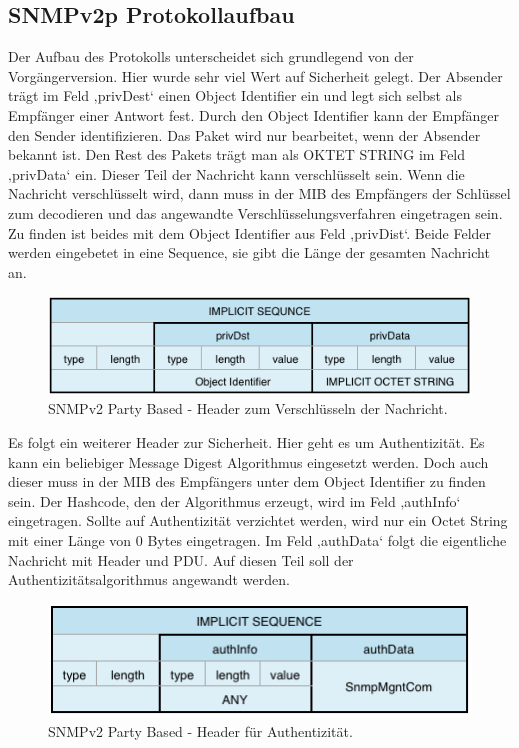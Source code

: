 \documentclass[11pt,a4paper]{article}
\begin{document}
\subsection{SNMPv2p Protokollaufbau}
Der Aufbau des Protokolls unterscheidet sich grundlegend von der Vorgängerversion. Hier wurde sehr viel Wert auf Sicherheit gelegt. Der Absender trägt im Feld ‚privDest‘ einen Object Identifier ein und legt sich selbst als Empfänger einer Antwort fest. Durch den Object Identifier kann der Empfänger den Sender identifizieren. Das Paket wird nur bearbeitet, wenn der Absender bekannt ist. Den Rest des Pakets trägt man als OKTET STRING im Feld ‚privData‘ ein. Dieser Teil der Nachricht kann verschlüsselt sein. Wenn die Nachricht verschlüsselt wird, dann muss in der MIB des Empfängers der Schlüssel zum decodieren und das angewandte Verschlüsselungsverfahren eingetragen sein. Zu finden ist beides mit dem Object Identifier aus Feld ‚privDist‘. Beide Felder werden eingebetet in eine Sequence, sie gibt die Länge der gesamten Nachricht an.\\
\begin{figure}[h]
	\centering
	\includegraphics[scale=1]{Bilder/SNMPv2p-Header-Encode}
	\caption{SNMPv2 Party Based - Header zum Verschlüsseln der Nachricht.}
\end{figure}
Es folgt ein weiterer Header zur Sicherheit. Hier geht es um Authentizität. Es kann ein beliebiger Message Digest Algorithmus eingesetzt werden. Doch auch dieser muss in der MIB des Empfängers unter dem Object Identifier zu finden sein. Der Hashcode, den der Algorithmus erzeugt, wird im Feld ‚authInfo‘ eingetragen. Sollte auf Authentizität verzichtet werden, wird nur ein Octet String mit einer Länge von 0 Bytes eingetragen. Im Feld ‚authData‘ folgt die eigentliche Nachricht mit Header und PDU. Auf diesen Teil soll der Authentizitätsalgorithmus angewandt werden.\\
\begin{figure}[h]
	\centering
	\includegraphics[scale=1]{Bilder/SNMPv2p-Header-Authentizitaet}
	\caption{SNMPv2 Party Based - Header für Authentizität.}
\end{figure}
\end{document}
